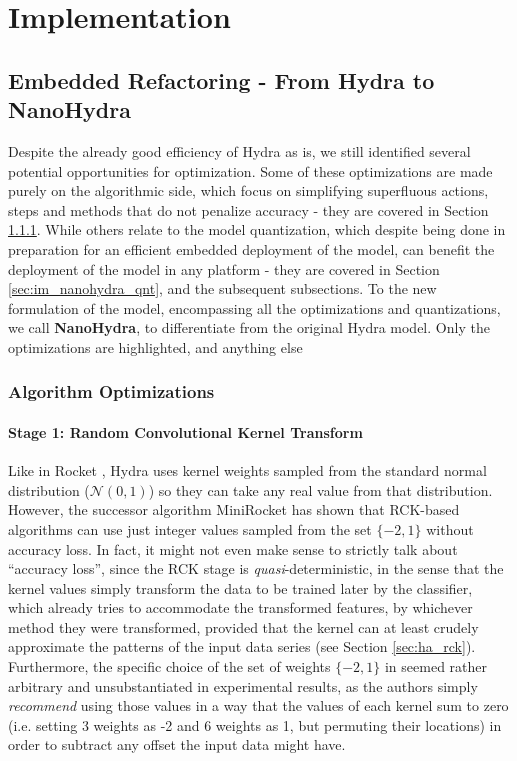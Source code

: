 \chapter{Implementation}
\label{ch:implementation}

\section{Embedded Refactoring - From Hydra to NanoHydra}\label{sec:im_nanohydra}

    Despite the already good efficiency of Hydra as is, we still identified several potential opportunities for optimization. Some of these optimizations are
    made purely on the algorithmic side, which focus on simplifying superfluous actions, steps and methods that do not penalize accuracy - they are covered in Section \ref{sec:im_nanohydra_algopt}.
    While others relate to the model quantization, which despite being done in preparation for an efficient embedded deployment of the model, can benefit the deployment of the model in any platform - they are covered in Section \ref{sec:im_nanohydra_qnt}, and the subsequent subsections.
    To the new formulation of the model, encompassing all the optimizations and quantizations, we call \textbf{NanoHydra}, to differentiate from the original Hydra model. Only the optimizations are highlighted, and anything else

    \subsection{Algorithm Optimizations}\label{sec:im_nanohydra_algopt}

        \subsubsection{Stage 1: Random Convolutional Kernel Transform}\label{sec:im_nanohydra_algopt_s1}
        
        Like in Rocket \cite{Dempster2020}, Hydra uses kernel weights sampled from the standard normal distribution ($\mathcal{N}(0,1)$) so they can take any real value from that distribution.
        However, the successor algorithm MiniRocket \cite{Dempster2021MR} has shown that RCK-based algorithms can use just integer values sampled from the  set $\{-2,1\}$ without accuracy loss. 
        In fact, it might not even make sense to strictly talk about ``accuracy loss'', since the RCK stage is \emph{quasi}-deterministic, in the sense that the kernel values simply transform the data to be trained later by the classifier,
        which already tries to accommodate the transformed features, by whichever method they were transformed, provided that the kernel can at least crudely approximate the patterns of the input data series (see Section \ref{sec:ha_rck}).
        Furthermore, the specific choice of the set of weights $\{-2,1\}$ in \cite{Dempster2021MR} seemed rather arbitrary and unsubstantiated in experimental results, as the authors simply \emph{recommend} using those values in a way that 
        the values of each kernel sum to zero (i.e. setting 3 weights as -2 and 6 weights as 1, but permuting their locations) in order to subtract any offset the input data might have.


